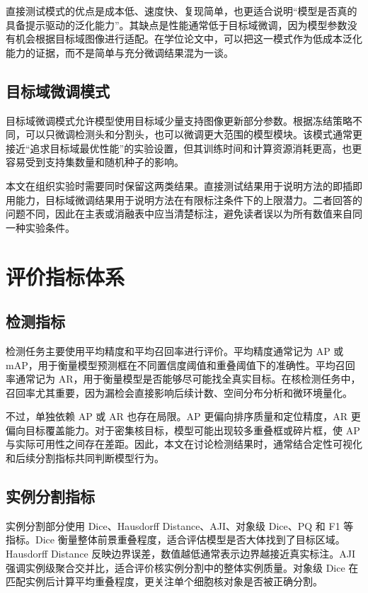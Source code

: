 直接测试模式的优点是成本低、速度快、复现简单，也更适合说明“模型是否真的具备提示驱动的泛化能力”。其缺点是性能通常低于目标域微调，因为模型参数没有机会根据目标域图像进行适配。在学位论文中，可以把这一模式作为低成本泛化能力的证据，而不是简单与充分微调结果混为一谈。

\subsection{目标域微调模式}
目标域微调模式允许模型使用目标域少量支持图像更新部分参数。根据冻结策略不同，可以只微调检测头和分割头，也可以微调更大范围的模型模块。该模式通常更接近“追求目标域最优性能”的实验设置，但其训练时间和计算资源消耗更高，也更容易受到支持集数量和随机种子的影响。

本文在组织实验时需要同时保留这两类结果。直接测试结果用于说明方法的即插即用能力，目标域微调结果用于说明方法在有限标注条件下的上限潜力。二者回答的问题不同，因此在主表或消融表中应当清楚标注，避免读者误以为所有数值来自同一种实验条件。

\section{评价指标体系}
\subsection{检测指标}
检测任务主要使用平均精度和平均召回率进行评价。平均精度通常记为 AP 或 mAP，用于衡量模型预测框在不同置信度阈值和重叠阈值下的准确性。平均召回率通常记为 AR，用于衡量模型是否能够尽可能找全真实目标。在核检测任务中，召回率尤其重要，因为漏检会直接影响后续计数、空间分布分析和微环境量化。

不过，单独依赖 AP 或 AR 也存在局限。AP 更偏向排序质量和定位精度，AR 更偏向目标覆盖能力。对于密集核目标，模型可能出现较多重叠框或碎片框，使 AP 与实际可用性之间存在差距。因此，本文在讨论检测结果时，通常结合定性可视化和后续分割指标共同判断模型行为。

\subsection{实例分割指标}
实例分割部分使用 Dice、Hausdorff Distance、AJI、对象级 Dice、PQ 和 F1 等指标。Dice 衡量整体前景重叠程度，适合评估模型是否大体找到了目标区域。Hausdorff Distance 反映边界误差，数值越低通常表示边界越接近真实标注。AJI 强调实例级聚合交并比，适合评价核实例分割中的整体实例质量。对象级 Dice 在匹配实例后计算平均重叠程度，更关注单个细胞核对象是否被正确分割。

